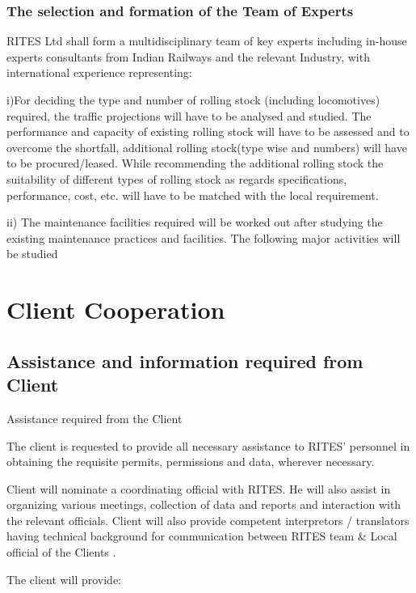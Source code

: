 \subsubsection{The selection and formation of the Team of Experts}


RITES Ltd shall form a multidisciplinary team of key experts including in-house experts consultants from Indian Railways
and the relevant Industry, with international experience representing:
 

i)For deciding the type and number of rolling stock (including locomotives) required, the traffic projections will
have to be analysed and studied. The performance and capacity of existing rolling stock will have to be assessed and to
overcome the shortfall, additional rolling stock(type wise and numbers) will have to be procured/leased. While
recommending the additional rolling stock the suitability of different types of rolling stock as regards
specifications, performance, cost, etc. will have to be matched with the local requirement.

ii) The maintenance facilities required will be worked out after studying the existing maintenance practices and
facilities. The following major activities will be studied


 


\section{Client Cooperation}
\subsection{Assistance and information required from Client}

 
Assistance required from the Client


The client is requested to provide all necessary assistance to RITES' personnel in obtaining the requisite permits,
permissions and data, wherever necessary.


Client will nominate a coordinating official with RITES. He will also assist in organizing various meetings, collection
of data and reports and interaction with the relevant officials. Client will also provide competent interpretors /
translators having technical background for communication between RITES team \& Local official of the Clients .


The client will provide:

